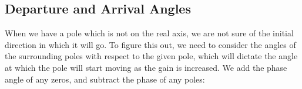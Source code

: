 \subsection{Departure and Arrival Angles}
When we have a pole which is not on the real axis, we are not sure of the initial direction in which it will go. To figure this out, we need to consider the angles of the surrounding poles with respect to the given pole, which will dictate the angle at which the pole will start moving as the gain is increased. We add the phase angle of any zeros, and subtract the phase of any poles:
\begin{figure}[ht]
    \centering




\begin{tikzpicture}[x=0.75pt,y=0.75pt,yscale=-1,xscale=1]


\end{tikzpicture}
\end{figure}
